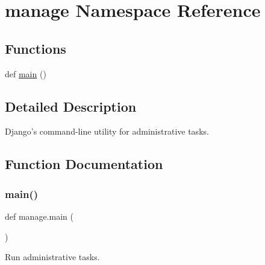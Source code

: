 \hypertarget{namespacemanage}{}\section{manage Namespace Reference}
\label{namespacemanage}
\subsection*{Functions}
\begin{DoxyCompactItemize}
\item 
def \hyperlink{namespacemanage_afd5b00260cc364aa5bde07e227c6ea78}{main} ()
\end{DoxyCompactItemize}


\subsection{Detailed Description}
\begin{DoxyVerb}Django's command-line utility for administrative tasks.\end{DoxyVerb}
 

\subsection{Function Documentation}
\mbox{\label{namespacemanage_afd5b00260cc364aa5bde07e227c6ea78}} 
\subsubsection{\texorpdfstring{main()}{main()}}
{\footnotesize\ttfamily def manage.\+main (\begin{DoxyParamCaption}{ }\end{DoxyParamCaption})}

\begin{DoxyVerb}Run administrative tasks.\end{DoxyVerb}
 